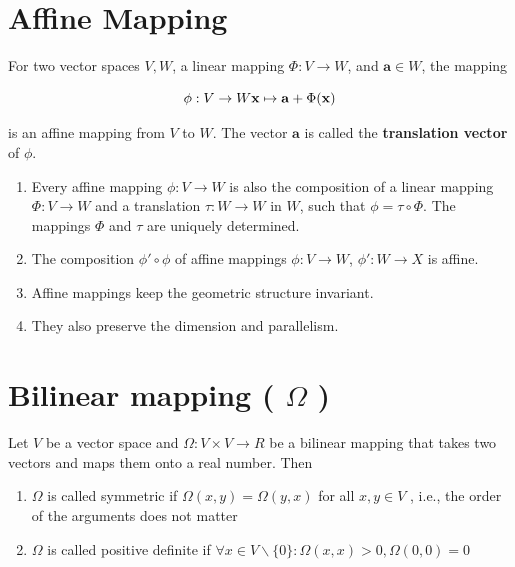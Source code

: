

\section{Affine Mapping \cite{mfml-1}}\label{Affine Mapping}

For two vector spaces $V, W$, a linear mapping $\Phi : V \to W$, and $\mathbf{a} \in W$, the mapping

\[
    \hfill
    \phi : V \to W
    \hfill
    \mathbf{x} \mapsto \mathbf{a} + \Phi(\mathbf{x})
    \hfill
\]

is an affine mapping from $V$ to $W$. The vector $\mathbf{a}$ is called the \textbf{translation vector} of $\phi$.

\begin{enumerate}
    \item Every affine mapping $\phi : V \to W$ is also the composition of a linear mapping $\Phi : V \to W$ and a translation $\tau : W \to W$ in $W$, such that $\phi = \tau \circ \Phi$. The mappings $\Phi$ and $\tau$ are uniquely determined.

    \item The composition $\phi' \circ \phi$ of affine mappings $\phi : V \to W$, $\phi': W \to X$ is affine.

    \item Affine mappings keep the geometric structure invariant. 
    
    \item They also preserve the dimension and parallelism.
\end{enumerate}


\section{Bilinear mapping ( $\Omega$ )}\label{Bilinear mapping}

Let $V$ be a vector space and $\Omega  : V × V \to R$ be a bilinear mapping that takes two vectors and maps them onto a real number. Then
\begin{enumerate}
    \item $\Omega$  is called symmetric if $\Omega (x, y) = \Omega (y, x)$ for all $x, y \in  V$ , i.e., the order of the arguments does not matter

    \item $\Omega$  is called positive definite if $\forall x \in  V\backslash \{0\} : \Omega (x, x) > 0 , \Omega (0, 0) = 0$
\end{enumerate}

